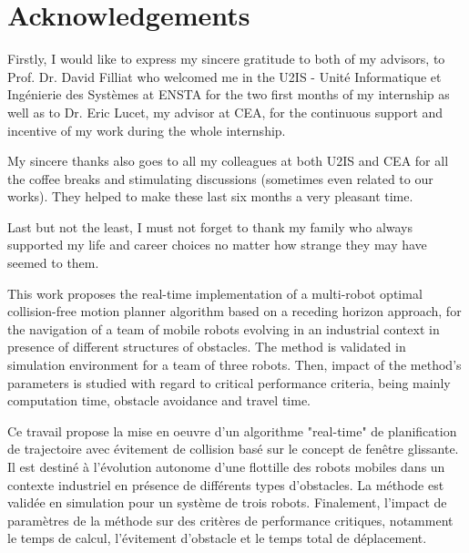 \documentclass[12pt]{book}
\numberwithin{equation}{section}
\newenvironment{abstractpage}
  {\cleardoublepage\vspace*{\fill}\thispagestyle{empty}}
  {\vfill\cleardoublepage}
\newenvironment{Abstract}[1]
  {\bigskip\selectlanguage{#1}%
   \begin{center}\bfseries\abstractname\end{center}}
  {\par\bigskip}
\begin{document}
\onehalfspace
\frontmatter

\pagestyle{fancy}
\fancyhead{}
\fancyhead[RE,LO]{\leftmark} %
\fancyfoot{}
\fancyfoot[OR,EL]{\thepage}

\let\savecleardoublepage\cleardoublepage
\let\cleardoublepage\clearpage
\chapter*{Acknowledgements}

Firstly, I would like to express my sincere gratitude to both of my advisors, to Prof. Dr. David Filliat who welcomed me in the U2IS - Unité Informatique et Ingénierie des Systèmes at ENSTA for the two first months of my internship as well as to Dr. Eric Lucet, my advisor at CEA, for the continuous support and incentive of my work during the whole internship.

My sincere thanks also goes to all my colleagues at both U2IS and CEA for all the coffee breaks and stimulating discussions (sometimes even related to our works). They helped to make these last six months a very pleasant time.

Last but not the least, I must not forget to thank my family who always supported my life and career choices no matter how strange they may have seemed to them.

\begin{abstractpage}
\thispagestyle{empty}
\begin{Abstract}{english}

This work proposes the real-time implementation of a multi-robot optimal collision-free motion planner algorithm based on a receding horizon approach, for the navigation of a team of mobile robots evolving in an industrial context in presence of different structures of obstacles. The method is validated in simulation environment for a team of three robots. Then, impact of the method's parameters is studied with regard to critical performance criteria, being mainly computation time, obstacle avoidance and travel time.

\end{Abstract}
\begin{Abstract}{french}

Ce travail propose la mise en oeuvre d'un algorithme "real-time" de planification de trajectoire avec évitement de collision basé sur le concept de fenêtre glissante. Il est destiné à l'évolution autonome d'une flottille des robots mobiles dans un contexte industriel en présence de différents types d'obstacles. La méthode est validée en simulation pour un système de trois robots. Finalement, l'impact de paramètres de la méthode sur des critères de performance critiques, notamment le temps de calcul, l'évitement d'obstacle et le temps total de déplacement.

\end{Abstract}
\end{abstractpage}
\let\cleardoublepage\savecleardoublepage
\end{document}
